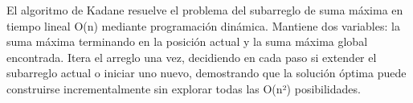 \markdownRendererDocumentBegin
\markdownRendererSectionBegin
{}\markdownRendererInterblockSeparator
{}El algoritmo de Kadane resuelve el problema del subarreglo de suma máxima en tiempo lineal O(n) mediante programación dinámica. Mantiene dos variables: la suma máxima terminando en la posición actual y la suma máxima global encontrada. Itera el arreglo una vez, decidiendo en cada paso si extender el subarreglo actual o iniciar uno nuevo, demostrando que la solución óptima puede construirse incrementalmente sin explorar todas las O(n²) posibilidades.\markdownRendererParagraphSeparator
{}
\markdownRendererSectionEnd \markdownRendererDocumentEnd